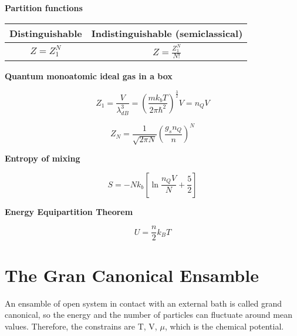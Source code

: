 \documentclass{article}
\begin{document}
\newpage

\begin{tcolorbox}[colframe=gray!90, colback=gray!5, coltitle=white, sharp corners, title=\textbf{Ideal Gas, Summary}, fonttitle=\large\bfseries]
    \textbf{Partition functions}


    \renewcommand{\arraystretch}{1.5}
    \begin{center}
        \begin{tabular}{|c|c|}
            \hline
            \textbf{Distinguishable} & \textbf{Indistinguishable (semiclassical)} \\ \hline
            \( Z = Z_1^N \)          & \( Z = \frac{Z_1^N}{N!} \)                 \\ \hline
        \end{tabular}

    \end{center}


    \textbf{Quantum monoatomic ideal gas in a box}

    \begin{equation}
        Z_1 = \frac{V}{\lambda_{dB}^3}= \left( \frac{mk_bT}{2\pi\hbar^2} \right)^{\frac{3}{2}}V= n_QV
    \end{equation}

    \begin{equation}
        Z_N = \frac{1}{\sqrt{2\pi N}}\left( \frac{g_s n_Q}{n} \right)^N
    \end{equation}

    \textbf{Entropy of mixing}

    \begin{equation}
        S = -Nk_b\left[ \ln{\frac{n_QV}{N}} + \frac{5}{2} \right]
    \end{equation}

    \textbf{Energy Equipartition Theorem}

    \begin{equation}
        U = \frac{n}{2}k_BT
    \end{equation}

\end{tcolorbox}

\newpage


\section{The Gran Canonical Ensamble}

An ensamble of open system in contact with an external bath is called grand canonical,
so the energy and the number of particles can fluctuate around mean values.
Therefore, the constrains are T, V, $\mu$, which is the chemical potential.
\end{document}
